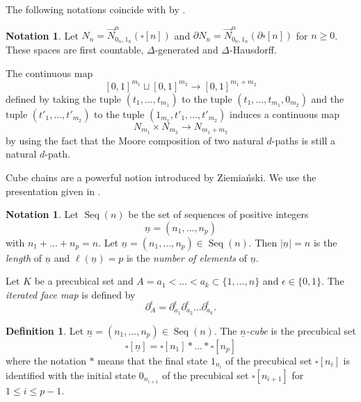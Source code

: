 \documentclass[a4paper,12pt]{amsart}
\newcommand{\de}{\partial}
\newcommand{\p}{\times}
\renewcommand{\vec}{\overrightarrow}
\theoremstyle{definition}
\newtheorem{defn}[thm]{Definition}
\newcommand{\bd}{\begin{defn}}
\newcommand{\ed}{\end{defn}}
\newtheorem{nota}[thm]{Notation}
\renewcommand{\leq}{\leqslant}
\renewcommand{\geq}{\geqslant}
\DeclareMathOperator{\seq}{Seq}
\begin{document}
The following notations coincide with \cite[Definition~4.8 and Definition~4.12]{NaturalRealization} by \cite[Proposition~4.10 and Proposition~4.14]{NaturalRealization}.

\begin{nota}
	Let $N_n = \vec{N}_{0_n,1_n}^n(\square[n])$ and $\de N_n = \vec{N}_{0_n,1_n}^n(\de\square[n])$ for $n\geq 0$. These spaces are first countable, $\Delta$-generated and $\Delta$-Hausdorff.
\end{nota}

The continuous map \[[0,1]^{m_1}\sqcup [0,1]^{m_2} \longrightarrow [0,1]^{m_1+m_2}\] defined by taking the tuple $(t_1,\dots,t_{m_1})$ to the tuple $(t_1,\dots,t_{m_1},0_{m_2})$ and the tuple $(t'_1,\dots,t'_{m_2})$ to the tuple $(1_{m_1},t'_1,\dots,t'_{m_2})$ induces a continuous map \[N_{m_1}\p N_{m_2}\longrightarrow N_{m_1+m_2}\] by using the fact that the Moore composition of two natural $d$-paths is still a natural $d$-path.


Cube chains are a powerful notion introduced by Ziemia{\'{n}}ski. We use the presentation given in \cite[Section~7]{MR4070250}. 

\begin{nota}
	Let $\seq(n)$ be the set of sequences of positive integers \[\underline{n}=(n_1,\dots,n_p)\] with $n_1+\dots + n_p=n$. Let $\underline{n}=(n_1,\dots,n_p) \in \seq(n)$. Then $|\underline{n}|=n$ is the \textit{length} of $\underline{n}$ and $\ell(\underline{n})=p$ is the \textit{number of elements} of $\underline{n}$. 
\end{nota}

Let $K$ be a precubical set and $A={a_1<\dots<a_k} \subset \{1,\dots,n\}$ and $\epsilon\in \{0,1\}$. The \textit{iterated face map} is defined by \[\de^\epsilon_A=\de^\epsilon_{a_1} \de^\epsilon_{a_2} \dots \de^\epsilon_{a_k}.\]

\bd 
Let $\underline{n}=(n_1,\dots,n_p)\in \seq(n)$. The \textit{$\underline{n}$-cube} is the precubical set 
\[
\square[\underline{n}] = \square[n_1] * \dots * \square[n_p]
\]
where the notation $*$ means that the final state $1_{n_i}$ of the precubical set $\square[n_i]$ is identified with the initial state $0_{n_{i+1}}$ of the precubical set $\square[n_{i+1}]$ for $1\leq i\leq p-1$.
\ed 
\end{document}

